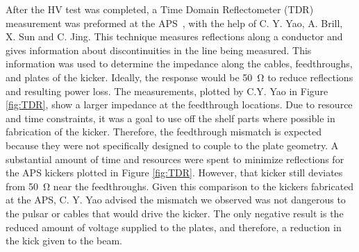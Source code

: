 After the HV test was completed, a Time Domain Reflectometer (TDR) measurement was preformed at the APS~\cite{TDR}, 
with the help of C. Y. Yao, A. Brill, X. Sun and C. Jing.
This technique measures reflections along a conductor and gives information about discontinuities in the line being measured. 
This information was used to determine the impedance along the cables, feedthroughs, and plates of the kicker. 
Ideally, the response would be \SI{50}{\ohm} to reduce reflections and resulting power loss. 
The measurements, plotted by C.Y. Yao in Figure \ref{fig:TDR}, show a larger impedance at the feedthrough locations.
Due to resource and time constraints, it was a goal to use off the shelf parts where possible in fabrication of the kicker.
Therefore, the feedthrough mismatch is expected because they were not specifically designed to couple to the plate geometry.
A substantial amount of time and resources were spent to minimize reflections for the APS kickers plotted in Figure \ref{fig:TDR}.
However, that kicker still deviates from \SI{50}{\ohm} near the feedthroughs.
Given this comparison to the kickers fabricated at the APS, C. Y. Yao advised the mismatch we observed was not dangerous to 
the pulsar or cables that would drive the kicker.  
The only negative result is the reduced amount of voltage supplied to the plates, and therefore, a reduction in the kick given to the beam.
